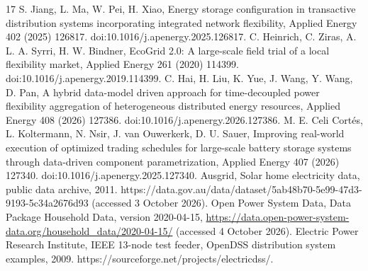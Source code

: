 \documentclass[11pt]{article}
\begin{document}
{\begin{thebibliography}{17}
 S. Jiang, L. Ma, W. Pei, H. Xiao, Energy storage configuration in transactive distribution systems incorporating integrated network flexibility, Applied Energy 402 (2025) 126817. doi:10.1016/j.apenergy.2025.126817.
 C. Heinrich, C. Ziras, A. L. A. Syrri, H. W. Bindner, EcoGrid 2.0: A large-scale field trial of a local flexibility market, Applied Energy 261 (2020) 114399. doi:10.1016/j.apenergy.2019.114399.
 C. Hai, H. Liu, K. Yue, J. Wang, Y. Wang, D. Pan, A hybrid data-model driven approach for time-decoupled power flexibility aggregation of heterogeneous distributed energy resources, Applied Energy 408 (2026) 127386. doi:10.1016/j.apenergy.2026.127386.
 M. E. Celi Cort\'{e}s, L. Koltermann, N. Nsir, J. van Ouwerkerk, D. U. Sauer, Improving real-world execution of optimized trading schedules for large-scale battery storage systems through data-driven component parametrization, Applied Energy 407 (2026) 127340. doi:10.1016/j.apenergy.2025.127340.
 Ausgrid, Solar home electricity data, public data archive, 2011. https://data.gov.au/data/dataset/5ab48b70-5e99-47d3-9193-5c34a2676d93 (accessed 3 October 2026).
 Open Power System Data, Data Package Household Data, version 2020-04-15, \url{https://data.open-power-system-data.org/household_data/2020-04-15/} (accessed 4 October 2026).
 Electric Power Research Institute, IEEE 13-node test feeder, OpenDSS distribution system examples, 2009. https://sourceforge.net/projects/electricdss/.
\end{thebibliography}
}
\end{document}
